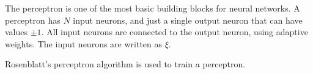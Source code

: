 The perceptron is one of the most basic building blocks for neural networks.
A perceptron has \(N\) input neurons, and just a single output neuron that can have values \(\pm1\).
All input neurons are connected to the output neuron, using adaptive weights.
The input neurons are written as \(\xi\).


Rosenblatt's perceptron algorithm is used to train a perceptron.
